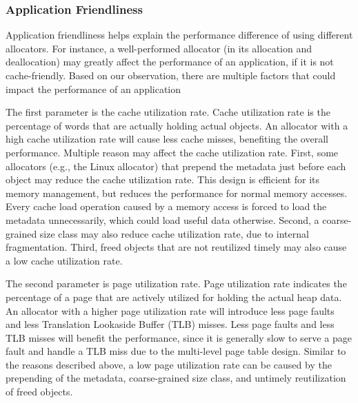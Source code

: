 \subsubsection{Application Friendliness} 
\label{sec:friendliness}

Application friendliness helps explain the performance difference of using different allocators. For instance, a well-performed allocator (in its allocation and deallocation) may greatly affect the performance of an application, if it is not cache-friendly. Based on our observation, there are multiple factors that could impact the performance of an application




The first parameter is the cache utilization rate. Cache utilization rate is the percentage of words that are actually holding actual objects. An allocator with a high cache utilization rate will cause less cache misses, benefiting the overall performance. Multiple reason may affect the cache utilization rate. First, some allocators (e.g., the Linux allocator) that  prepend the metadata just before each object may reduce the cache utilization rate. This design is efficient for its memory management, but reduces the performance for normal memory accesses. Every cache load operation caused by a memory access is forced to load the metadata unnecessarily, which could load useful data otherwise.  Second, a coarse-grained size class may also reduce cache utilization rate, due to internal fragmentation. Third, freed objects that are not reutilized timely may also cause a low cache utilization rate. 


The second parameter is page utilization rate. Page utilization rate indicates the percentage of a page that are actively utilized for holding the actual heap data. An allocator with a higher page utilization rate will introduce less page faults and less Translation Lookaside Buffer (TLB) misses. Less page faults and less TLB misses will benefit the performance, since it is generally slow to serve a page fault and handle a TLB miss due to the multi-level page table design. Similar to the reasons described above, a low page utilization rate can be caused by the prepending of the metadata, coarse-grained size class, and untimely reutilization of freed objects. 

